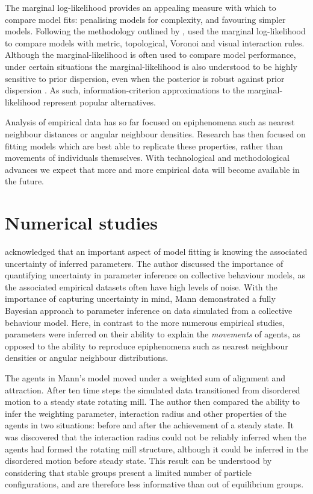 The marginal log-likelihood provides an appealing measure with which to compare
model fits: penalising models for complexity, and favouring simpler models.
Following the methodology outlined by \textcite{mann13},
\textcite{strandburg13} used the marginal log-likelihood to compare models with
metric, topological, Voronoi and visual interaction rules. Although the
marginal-likelihood is often used to compare model performance, under certain
situations the marginal-likelihood is also understood to be highly sensitive to
prior dispersion, even when the posterior is robust against prior dispersion
\parencite{fong20}. As such, information-criterion approximations to the
marginal-likelihood represent popular alternatives.

Analysis of empirical data has so far focused on epiphenomena such as nearest
neighbour distances or angular neighbour densities. Research has then focused
on fitting models which are best able to replicate these properties, rather
than movements of individuals themselves. With technological and methodological
advances we expect that more and more empirical data will become available in
the future.

\section{Numerical studies}
\label{sec:numerical_studies}

\textcite{mann11} acknowledged that an important aspect of model fitting is
knowing the associated uncertainty of inferred parameters. The author discussed
the importance of quantifying uncertainty in parameter inference on collective
behaviour models, as the associated empirical datasets often have high levels
of noise. With the importance of capturing uncertainty in mind, Mann
demonstrated a fully Bayesian approach to parameter inference on data simulated
from a collective behaviour model. Here, in contrast to the more numerous
empirical studies, parameters were inferred on their ability to explain the
\emph{movements} of agents, as opposed to the ability to reproduce epiphenomena
such as nearest neighbour densities or angular neighbour distributions.

The agents in Mann's model moved under a weighted sum of alignment and
attraction. After ten time steps the simulated data transitioned from
disordered motion to a steady state rotating mill. The author then compared the
ability to infer the weighting parameter, interaction radius and other
properties of the agents in two situations: before and after the achievement of
a steady state. It was discovered that the interaction radius could not be
reliably inferred when the agents had formed the rotating mill structure,
although it could be inferred in the disordered motion before steady state.
This result can be understood by considering that stable groups present a
limited number of particle configurations, and are therefore less informative
than out of equilibrium groups.

